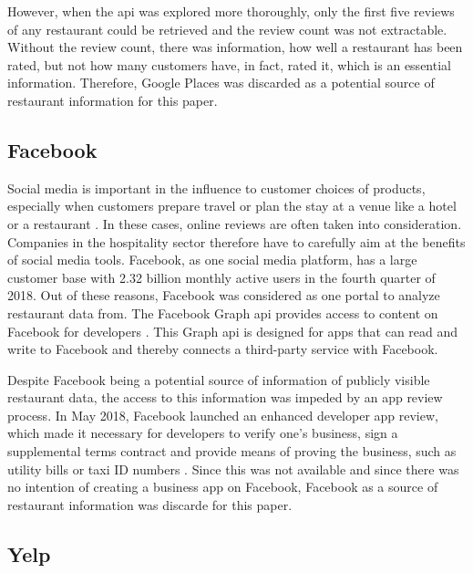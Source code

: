 \documentclass[a4paper, 11pt, oneside]{Thesis}  %
\begin{document}
However, when the \ac{api} was explored more thoroughly, only the first five reviews of any restaurant could be retrieved and the review count was not extractable. Without the review count, there was information, how well a restaurant has been rated, but not how many customers have, in fact, rated it, which is an essential information. Therefore, Google Places was discarded as a potential source of restaurant information for this paper.

\subsection{Facebook}

Social media is important in the influence to customer choices of products, especially when customers prepare travel or plan the stay at a venue like a hotel or a restaurant \cite{Kwok.2013}. In these cases, online reviews are often taken into consideration. Companies in the hospitality sector therefore have to carefully aim at the benefits of social media tools. Facebook, as one social media platform, has a large customer base with 2.32 billion monthly active users in the fourth quarter of 2018\cite{statista.facebook.2019}. Out of these reasons, Facebook was considered as one portal to analyze restaurant data from. The Facebook Graph \ac{api} provides access to content on Facebook for developers \cite{facebook.graph.2019}. This Graph \ac{api} is designed for apps that can read and write to Facebook and thereby connects a third-party service with Facebook.

Despite Facebook being a potential source of information of publicly visible restaurant data, the access to this information was impeded by an app review process. In May 2018, Facebook launched an enhanced developer app review, which made it necessary for developers to verify one's business, sign a supplemental terms contract and provide means of proving the business, such as utility bills or taxi ID numbers \cite{KonstantinosPapamiltiadis.01.05.2018}. Since this was not available and since there was no intention of creating a business app on Facebook, Facebook as a source of restaurant information was discarde for this paper.

\subsection{Yelp}
\end{document}
